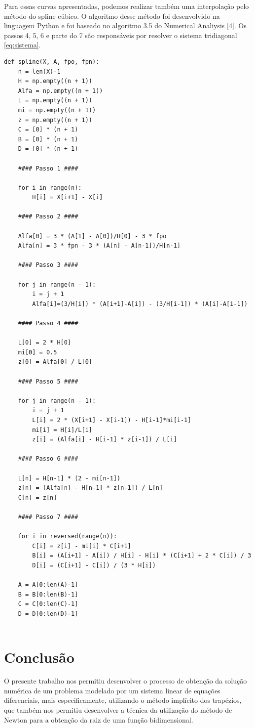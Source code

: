 \documentclass[a4paper,10pt]{article}
\begin{document}
  Para essas curvas apresentadas, podemos realizar também uma interpolação pelo método do spline cúbico.
  O algoritmo desse método foi desenvolvido na linguagem Python e foi baseado no algoritmo 3.5 do Numerical Analiysis [4]. 
  Os passos 4, 5, 6 e parte do 7 são responsáveis por resolver o sistema tridiagonal \ref{eq:sistema}.
  \begin{lstlisting}[frame=single]
   def spline(X, A, fpo, fpn):
	n = len(X)-1
	H = np.empty((n + 1))
	Alfa = np.empty((n + 1))
	L = np.empty((n + 1))
	mi = np.empty((n + 1))
	z = np.empty((n + 1))
	C = [0] * (n + 1)
	B = [0] * (n + 1)
	D = [0] * (n + 1)
	
	#### Passo 1 ####

	for i in range(n):
		H[i] = X[i+1] - X[i]
		
	#### Passo 2 ####
		
	Alfa[0] = 3 * (A[1] - A[0])/H[0] - 3 * fpo
	Alfa[n] = 3 * fpn - 3 * (A[n] - A[n-1])/H[n-1]
	
	#### Passo 3 ####

	for j in range(n - 1):
		i = j + 1
		Alfa[i]=(3/H[i]) * (A[i+1]-A[i]) - (3/H[i-1]) * (A[i]-A[i-1])
		
	#### Passo 4 ####
	
	L[0] = 2 * H[0]
	mi[0] = 0.5
	z[0] = Alfa[0] / L[0]

	#### Passo 5 ####
	
	for j in range(n - 1):
		i = j + 1
		L[i] = 2 * (X[i+1] - X[i-1]) - H[i-1]*mi[i-1]
		mi[i] = H[i]/L[i]
		z[i] = (Alfa[i] - H[i-1] * z[i-1]) / L[i]

	#### Passo 6 ####	
	
	L[n] = H[n-1] * (2 - mi[n-1])
	z[n] = (Alfa[n] - H[n-1] * z[n-1]) / L[n]
	C[n] = z[n]
	
	#### Passo 7 ####

	for i in reversed(range(n)):
		C[i] = z[i] - mi[i] * C[i+1]
		B[i] = (A[i+1] - A[i]) / H[i] - H[i] * (C[i+1] + 2 * C[i]) / 3
		D[i] = (C[i+1] - C[i]) / (3 * H[i])

	A = A[0:len(A)-1]
	B = B[0:len(B)-1]
	C = C[0:len(C)-1]
	D = D[0:len(D)-1]
	
  \end{lstlisting}

  \section{Conclusão}
  O presente trabalho nos permitiu desenvolver o processo de obtenção da solução numérica de um problema modelado por um sistema linear de equações diferenciais, mais especificamente, utilizando o método implícito dos trapézios, que também nos permitiu desenvolver a técnica da utilização do método de Newton para a obtenção da raiz de uma função bidimensional.
  
\end{document}
